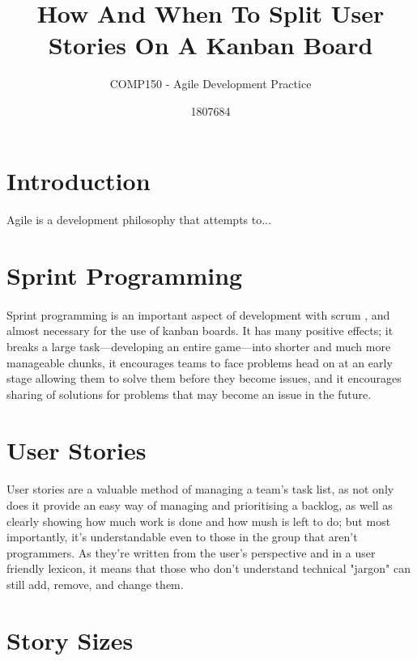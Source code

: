 \documentclass{scrartcl}
\title{How And When To Split User Stories On A Kanban Board}
\subtitle{COMP150 - Agile Development Practice}
\author{1807684}
\begin{document}
\maketitle

\section{Introduction}
\paragraph{}
Agile is a development philosophy that attempts to...%

\section{Sprint Programming}
\paragraph{}
Sprint programming is an important aspect of development with scrum , and almost necessary for the use of kanban boards. It has many positive effects; it breaks a large task—developing an entire game—into shorter and much more manageable chunks, it encourages teams to face problems head on at an early stage allowing them to solve them before they become issues, and it encourages sharing of solutions for problems that may become an issue in the future.

\section{User Stories}
\paragraph{}
User stories are a valuable method of managing a team's task list, as not only does it provide an easy way of managing and prioritising a backlog, as well as clearly showing how much work is done and how mush is left to do; but most importantly, it's understandable even to those in the group that aren't programmers. As they're written from the user's perspective and in a user friendly lexicon, it means that those who don't understand technical "jargon" can still add, remove, and change them. %

\section{Story Sizes}
\end{document}
